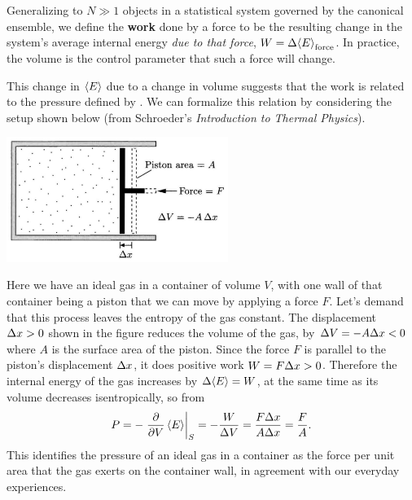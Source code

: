 \begin{shaded}
  Generalizing to $N \gg 1$ objects in a statistical system governed by the canonical ensemble, we define the \textbf{work} done by a force to be the resulting change in the system's average internal energy \textit{due to that force}, $W = \Delta\!\left\langle E \right\rangle_{\text{force}}$.
  In practice, the volume is the control parameter that such a force will change.
\end{shaded}

This change in $\left\langle E \right\rangle$ due to a change in volume suggests that the work is related to the pressure defined by .
We can formalize this relation by considering the setup shown below (from Schroeder's \textit{Introduction to Thermal Physics}). \\[-24 pt]
\begin{center}
  \includegraphics[width=0.54\textwidth]{figs/unit05_piston.pdf} %
\end{center}

Here we have an ideal gas in a container of volume $V$, with one wall of that container being a piston that we can move by applying a force $F$.
Let's demand that this process leaves the entropy of the gas constant.
The displacement $\Delta x > 0$ shown in the figure reduces the volume of the gas, by $\Delta V = -A\Delta x < 0$ where $A$ is the surface area of the piston.
Since the force $F$ is parallel to the piston's displacement $\Delta x$, it does positive work $W = F\Delta x > 0$.
Therefore the internal energy of the gas increases by $\Delta\!\left\langle E \right\rangle = W$, at the same time as its volume decreases isentropically, so from 
\begin{equation}
  P = -\left. \frac{\partial }{\partial V} \left\langle E \right\rangle\right|_S = -\frac{W}{\Delta V} = \frac{F\Delta x}{A\Delta x} = \frac{F}{A}.
\end{equation}
This identifies the pressure of an ideal gas in a container as the force per unit area that the gas exerts on the container wall, in agreement with our everyday experiences.


